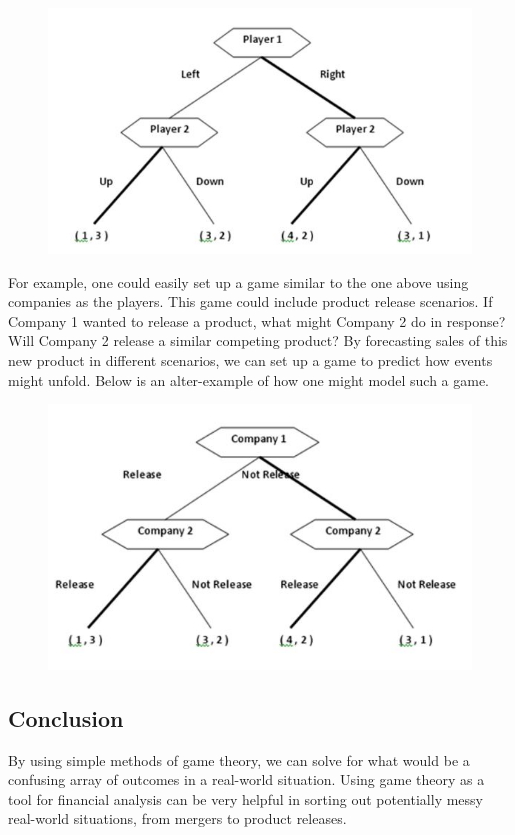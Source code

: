 \documentclass[]{report}
\begin{document}
\begin{figure}[h!]
	\centering
	\includegraphics[width=0.7\linewidth]{images/BackwardInduction3}
	\caption{}
	\label{fig:BackwardInduction3}
\end{figure}
For example, one could easily set up a game similar to the one above using companies as the players. This game could include product release scenarios. If Company 1 wanted to release a product, what might Company 2 do in response? Will Company 2 release a similar competing product? By forecasting sales of this new product in different scenarios, we can set up a game to predict how events might unfold. Below is an alter-example of how one might model such a game.


\begin{figure}
\centering
\includegraphics[width=0.7\linewidth]{images/BackwardInduction4}
\caption{}
\label{fig:BackwardInduction4}
\end{figure}

\subsection{Conclusion}
By using simple methods of game theory, we can solve for what would be a confusing array 
of outcomes in a real-world situation. Using game theory as a tool for financial analysis can be very helpful in sorting out potentially messy real-world situations, from mergers to product releases.
\end{document}
